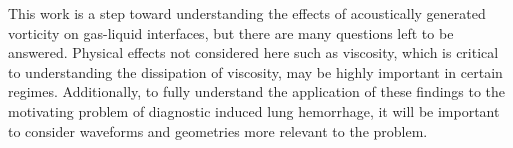 This work is a step toward understanding the effects of acoustically
generated vorticity on gas-liquid interfaces, but there are many
questions left to be answered. Physical effects not considered here
such as viscosity, which is critical to understanding the dissipation
of viscosity, may be highly important in certain
regimes. Additionally, to fully understand the application of these
findings to the motivating problem of diagnostic induced lung
hemorrhage, it will be important to consider waveforms and geometries
more relevant to the problem.













